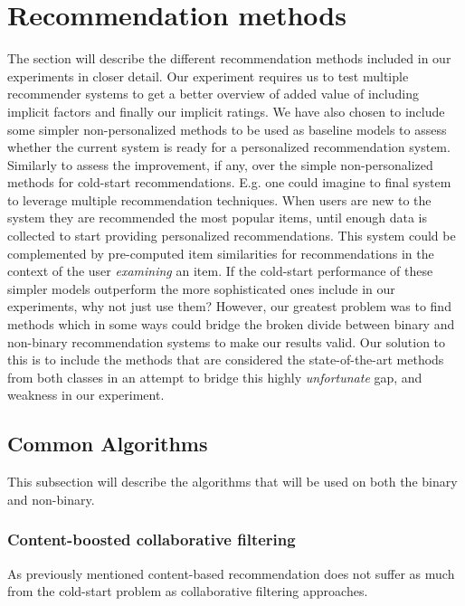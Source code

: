 
\section{Recommendation methods}



The section will describe the different recommendation methods included in our experiments in closer detail. Our experiment requires us to test multiple recommender systems to get a better overview of added value of including implicit
factors and finally our implicit ratings.
We have also chosen to include some simpler non-personalized methods to be used as baseline models to assess whether
the current system is ready for a personalized recommendation system. Similarly to assess the improvement, if any,
over the simple non-personalized methods for cold-start recommendations. E.g. one could imagine to final system to leverage multiple recommendation techniques. When users are new to the system they
are recommended the most popular items, until enough data is collected to start providing personalized recommendations. This system could be complemented by pre-computed item similarities for recommendations in the context of the user
\emph{examining} an item. If the cold-start performance of these simpler models outperform the more sophisticated ones
include in our experiments, why not just use them? However, our greatest problem was to find methods which in some ways
could bridge the broken divide between binary and non-binary recommendation systems to make our results valid. Our solution to this is to include the methods that are considered the state-of-the-art methods from both classes in an attempt to bridge this highly \emph{unfortunate} gap, and weakness in our experiment.

\subsection{Common Algorithms}

This subsection will describe the algorithms that will be used on both the binary and non-binary.



\subsubsection{Content-boosted collaborative filtering}

As previously mentioned content-based recommendation does not suffer as much from the cold-start problem as
collaborative filtering approaches. 

